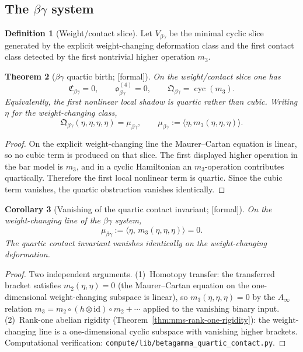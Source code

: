 \documentclass[11pt,oneside]{memoir}
\numberwithin{equation}{chapter}
\newtheorem{theorem}{Theorem}[chapter]
\newtheorem{corollary}[theorem]{Corollary}
\theoremstyle{definition}
\newtheorem{definition}[theorem]{Definition}
\newcommand{\ClaimStatusProvedHere}{\textnormal{[formal]}}
\begin{document}
\subsection{The \texorpdfstring{$\beta\gamma$}{betagamma} system}
\label{subsec:nms-betagamma}

\begin{definition}[Weight/contact slice]
\label{def:nms-betagamma-slice}
Let $V_{\beta\gamma}$ be the minimal cyclic slice generated by the explicit weight-changing deformation class and the first contact class detected by the first nontrivial higher operation $m_3$.
\end{definition}

\begin{theorem}[\texorpdfstring{$\beta\gamma$}{betagamma} quartic birth; \ClaimStatusProvedHere]
\label{thm:nms-betagamma-quartic-birth}
On the weight/contact slice one has
\[
\mathfrak C_{\beta\gamma}=0,
\qquad
\mathfrak o_{\beta\gamma}^{(4)}=0,
\qquad
\mathfrak Q_{\beta\gamma}=\operatorname{cyc}(m_3).
\]
Equivalently, the first nonlinear local shadow is quartic rather than cubic.  Writing $\eta$ for the weight-changing class,
\[
\mathfrak Q_{\beta\gamma}(\eta,\eta,\eta,\eta)
=
\mu_{\beta\gamma},
\qquad
\mu_{\beta\gamma}:=\langle \eta,m_3(\eta,\eta,\eta)\rangle.
\]
\end{theorem}

\begin{proof}
On the explicit weight-changing line the Maurer--Cartan equation is linear, so no cubic term is produced on that slice.  The first displayed higher operation in the bar model is $m_3$, and in a cyclic Hamiltonian an $m_3$-operation contributes quartically.  Therefore the first local nonlinear term is quartic.  Since the cubic term vanishes, the quartic obstruction vanishes identically.\qedhere
\end{proof}

\begin{corollary}[Vanishing of the quartic contact invariant; \ClaimStatusProvedHere]
\label{cor:nms-betagamma-mu-vanishing}
On the weight-changing line of the $\beta\gamma$ system,
\[
  \mu_{\beta\gamma} := \langle \eta,\, m_3(\eta,\eta,\eta) \rangle = 0.
\]
The quartic contact invariant vanishes identically on the weight-changing
deformation.
\end{corollary}

\begin{proof}
Two independent arguments.
(1)~Homotopy transfer: the transferred bracket satisfies
$m_2(\eta,\eta) = 0$ (the Maurer--Cartan equation on the one-dimensional
weight-changing subspace is linear), so
$m_3(\eta,\eta,\eta) = 0$ by the $A_\infty$ relation
$m_3 = m_2 \circ (h \otimes \mathrm{id}) \circ m_2 + \cdots$
applied to the vanishing binary input.
(2)~Rank-one abelian rigidity (Theorem~\ref{thm:nms-rank-one-rigidity}):
the weight-changing line is a one-dimensional cyclic subspace with
vanishing higher brackets.
Computational verification: \texttt{compute/lib/betagamma\_quartic\_contact.py}.
\end{proof}
\end{document}
